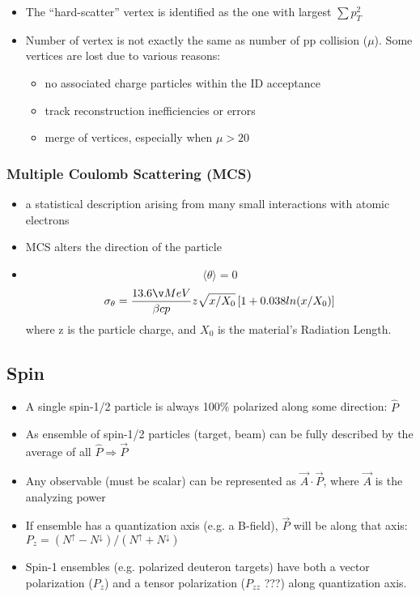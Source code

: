 \begin{itemize}
    \item The ``hard-scatter'' vertex is identified as the one with largest $\sum p_T^2$
    \item Number of vertex is not exactly the same as number of pp collision ($\mu$).
	Some vertices are lost due to various reasons:
	\begin{itemize}
	    \item no associated charge particles within the ID acceptance
	    \item track reconstruction inefficiencies or errors
	    \item merge of vertices, especially when $\mu > 20$
	\end{itemize}
\end{itemize}

\subsubsection{Multiple Coulomb Scattering (MCS)}
\begin{itemize}
    \item a statistical description arising from many small interactions with
	atomic electrons
    \item MCS alters the direction of the particle
    \item 
	 $$ \langle\theta\rangle = 0 $$
	 $$ \sigma_\theta = \frac{13.6 \v MeV}{\beta cp}z\sqrt{x/X_0}\left[ 1 + 0.038ln (x/X_0) \right]$$
	 where z is the particle charge, and $X_0$ is the material's Radiation
	 Length.
\end{itemize}

\subsection{Spin}
\begin{itemize}
    \item A single spin-1/2 particle is always 100\% polarized along some direction: $\hat{P}$
    \item As ensemble of spin-1/2 particles (target, beam) can be fully described 
	by the average of all $\hat{P} \Rightarrow \vec{P}$ 
    \item Any observable (must be scalar) can be represented as 
	$\vec{A} \cdot \vec{P}$, where $\vec{A}$ is the analyzing power
    \item If ensemble has a quantization axis (e.g. a B-field), $\vec{P}$ will 
	be along that axis: $P_z = (N^\uparrow - N^\downarrow)/(N^\uparrow + N^\downarrow)$
    \item Spin-1 ensembles (e.g. polarized deuteron targets) have both a vector
	polarization ($P_z$) and a tensor polarization ($P_{zz}$ ???) along
	quantization axis.
\end{itemize}
